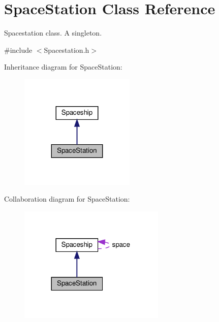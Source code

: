 \hypertarget{classSpaceStation}{}\section{Space\+Station Class Reference}
\label{classSpaceStation}


Spacestation class. A singleton.  




{\ttfamily \#include $<$Spacestation.\+h$>$}



Inheritance diagram for Space\+Station\+:\nopagebreak
\begin{figure}[H]
\begin{center}
\leavevmode
\includegraphics[width=155pt]{classSpaceStation__inherit__graph}
\end{center}
\end{figure}


Collaboration diagram for Space\+Station\+:\nopagebreak
\begin{figure}[H]
\begin{center}
\leavevmode
\includegraphics[width=197pt]{classSpaceStation__coll__graph}
\end{center}
\end{figure}
